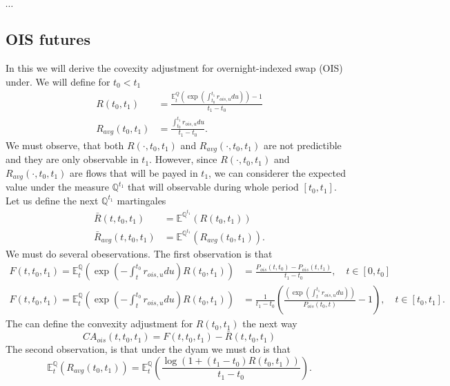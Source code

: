 \documentclass[a4paper,10pt]{article}
\newcommand{\1}{\mathbf{1}}
\begin{document}
$\cdots$

\subsection{OIS futures}
In this we will derive the covexity adjustment for overnight-indexed swap (OIS) under. We will define for $t_0 < t_1$
\begin{align*}
R(t_0,t_1) &= \frac{\mathbb{E}_t^{Q}\left(\exp\left(\int_{t_0}^{t_1}r_{ois,u} du\right)\right) - 1}{t_1 - t_0} \\
R_{avg}(t_0,t_1) &= \frac{\int_{t_0}^{t_1}r_{ois,u} du}{t_1 - t_0}.
\end{align*}
We must observe, that both $R(\cdot,t_0,t_1)$ and $R_{avg}(\cdot,t_0,t_1)$  are not predictible and they are only observable in $t_1$. However, since
$R(\cdot,t_0,t_1)$ and $R_{avg}(\cdot,t_0,t_1)$ are flows that will be payed in $t_1$, we can considerer the expected value under the measure $\mathbb{Q}^{t_1}$ that will observable during whole period $[t_0, t_1]$. Let us define the next $\mathbb{Q}^{t_1}$ martingales  
\begin{align*} 
\bar{R}(t,t_0,t_1) &= \mathbb{E}^{\mathbb{Q}^{t_1}}\left( R(t_0,t_1)  \right) \\
\bar{R}_{avg}(t,t_0,t_1) &= \mathbb{E}^{\mathbb{Q}^{t_1}}\left( R_{avg}(t_0,t_1)  \right).
\end{align*}
We must do several obeservations. The first observation is that
\begin{align*}
F(t,t_0,t_1)=\mathbb{E}_{t}^{\mathbb{Q}}\left(\exp\left(-\int_{t}^{t_0} r_{ois,u} du \right) R(t_0,t_1) \right) &= \frac{P_{ois}(t,t_0)- P_{ois}(t,t_1)}{t_1 - t_0}, \quad t \in [0,t_0] \\
F(t,t_0,t_1)=\mathbb{E}_{t}^{\mathbb{Q}}\left(\exp\left(-\int_{t}^{t_0} r_{ois,u} du \right) R(t_0,t_1) \right) &= \frac{1}{t_1 - t_0} \left(\frac{\left( \exp\left(\int_{t}^{t_1}r_{ois,u} du\right)\right)}{P_{ois}(t_0,t)}-1\right), \quad  t \in  [t_0, t_1].
\end{align*}
The can define the convexity adjustment for $ R(t_0,t_1)$ the next way
\begin{equation}\label{R_ois_ca}
CA_{ois}(t,t_0,t_1) = F(t,t_0,t_1) - \bar{R}(t,t_0,t_1) 
\end{equation}
The second observation, is that under the dyam we must do is that
\begin{equation*}
\mathbb{E}_{t}^{\mathbb{Q}}\left(R_{avg}(t_0,t_1) \right) = \mathbb{E}_t^{\mathbb{Q}}\left( \frac{\log\left(1+(t_1 - t_0)R(t_0,t_1) \right)}{t_1 - t_0} \right).  
\end{equation*}
\end{document}

